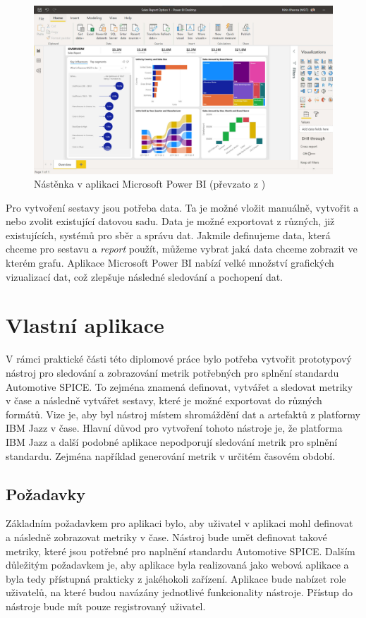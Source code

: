 \documentclass[czech,master]{diploma}
\begin{document}
\begin{figure}[!ht]
    \centering
    \includegraphics[width=1\textwidth]{Diplomka/Figures/powerbi-dashboard.jpg}
    \caption{Nástěnka v aplikaci Microsoft Power BI (převzato z \cite{ref:microsoft_bi_general})}
    \label{fig:powerbi_dashboard}
\end{figure}

Pro vytvoření sestavy jsou potřeba data. Ta je možné vložit manuálně, vytvořit a nebo zvolit existující datovou sadu. Data je možné exportovat z různých, již existujících, systémů pro sběr a správu dat. Jakmile definujeme data, která chceme pro sestavu a \textit{report} použít, můžeme vybrat jaká data chceme zobrazit ve kterém grafu. Aplikace Microsoft Power BI nabízí velké množství grafických vizualizací dat, což zlepšuje následné sledování a pochopení dat.


\chapter{Vlastní aplikace}
\label{sec:my_app}
V rámci  praktické části této diplomové práce bylo potřeba vytvořit  prototypový nástroj pro sledování a zobrazování metrik potřebných pro splnění standardu Automotive SPICE. To zejména znamená definovat, vytvářet a sledovat metriky v čase a následně vytvářet sestavy, které je možné exportovat do různých formátů. Vize je, aby byl nástroj místem shromáždění dat a artefaktů z platformy IBM Jazz v čase. Hlavní důvod pro vytvoření tohoto nástroje je, že platforma IBM Jazz a další podobné aplikace nepodporují sledování metrik pro splnění standardu. Zejména například generování metrik v určitém časovém období.

\section{Požadavky}
\label{sec:requirements}
Základním požadavkem pro aplikaci bylo, aby uživatel v aplikaci mohl definovat a následně zobrazovat metriky v čase. Nástroj bude umět definovat takové metriky, které jsou potřebné pro naplnění standardu Automotive SPICE. Dalším důležitým požadavkem je, aby aplikace byla realizovaná jako webová aplikace a byla tedy přístupná prakticky z jakéhokoli zařízení. Aplikace bude nabízet role uživatelů, na které budou navázány jednotlivé funkcionality nástroje. Přístup do nástroje bude mít pouze registrovaný uživatel.
\end{document}

